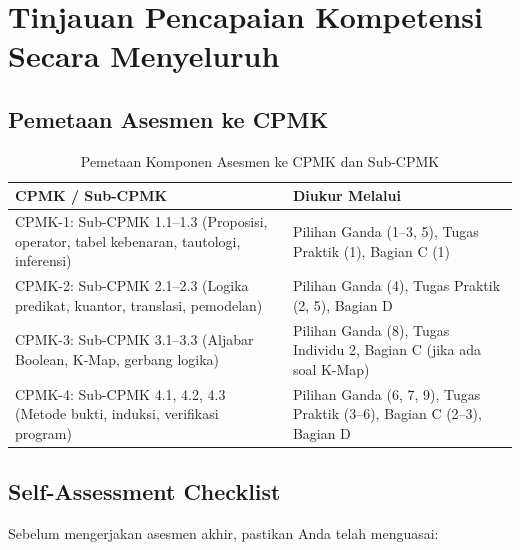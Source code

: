 \section{Tinjauan Pencapaian Kompetensi Secara Menyeluruh}

\subsection{Pemetaan Asesmen ke CPMK}

\begin{table}[htbp]
\centering
\begin{tabular}{|>{\raggedright\arraybackslash}p{5cm}|>{\raggedright\arraybackslash}p{8cm}|}
\hline
\textbf{CPMK / Sub-CPMK} & \textbf{Diukur Melalui} \\
\hline
CPMK-1: Sub-CPMK 1.1--1.3 (Proposisi, operator, tabel kebenaran, tautologi, inferensi) & Pilihan Ganda (1--3, 5), Tugas Praktik (1), Bagian C (1) \\
\hline
CPMK-2: Sub-CPMK 2.1--2.3 (Logika predikat, kuantor, translasi, pemodelan) & Pilihan Ganda (4), Tugas Praktik (2, 5), Bagian D \\
\hline
CPMK-3: Sub-CPMK 3.1--3.3 (Aljabar Boolean, K-Map, gerbang logika) & Pilihan Ganda (8), Tugas Individu 2, Bagian C (jika ada soal K-Map) \\
\hline
CPMK-4: Sub-CPMK 4.1, 4.2, 4.3 (Metode bukti, induksi, verifikasi program) & Pilihan Ganda (6, 7, 9), Tugas Praktik (3--6), Bagian C (2--3), Bagian D \\
\hline
\end{tabular}
\caption{Pemetaan Komponen Asesmen ke CPMK dan Sub-CPMK}
\end{table}

\subsection{Self-Assessment Checklist}

Sebelum mengerjakan asesmen akhir, pastikan Anda telah menguasai:

